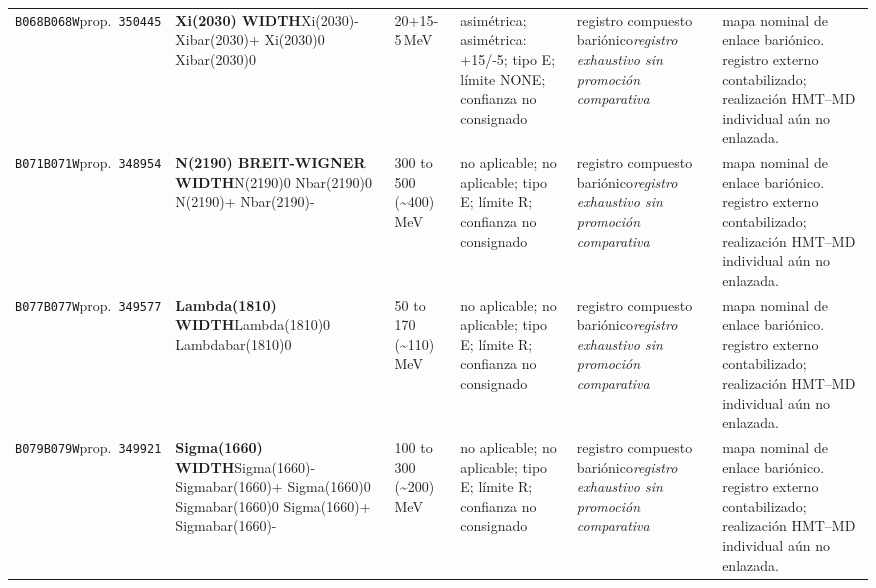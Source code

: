 \begin{landscape}
\begin{longtable}{L{1.85cm}L{4.45cm}L{2.35cm}L{4.05cm}L{3.35cm}L{7.15cm}}
\texttt{B068}\newline \texttt{B068W}\newline prop.\ \texttt{350445} & \textbf{Xi(2030) WIDTH}\newline Xi(2030)- \textbar{}\allowbreak{} Xibar(2030)+ \textbar{}\allowbreak{} Xi(2030)0 \textbar{}\allowbreak{} Xibar(2030)0 & 20+15-5\,MeV & asimétrica; asimétrica: +15/-5; tipo E; límite NONE; confianza no consignado & registro compuesto bariónico\newline \emph{registro exhaustivo sin promoción comparativa} & mapa nominal de enlace bariónico. registro externo contabilizado; realización HMT--MD individual aún no enlazada. \\
\texttt{B071}\newline \texttt{B071W}\newline prop.\ \texttt{348954} & \textbf{N(2190) BREIT-WIGNER WIDTH}\newline N(2190)0 \textbar{}\allowbreak{} Nbar(2190)0 \textbar{}\allowbreak{} N(2190)+ \textbar{}\allowbreak{} Nbar(2190)- & 300 to 500 (\textasciitilde{}400)\,MeV & no aplicable; no aplicable; tipo E; límite R; confianza no consignado & registro compuesto bariónico\newline \emph{registro exhaustivo sin promoción comparativa} & mapa nominal de enlace bariónico. registro externo contabilizado; realización HMT--MD individual aún no enlazada. \\
\texttt{B077}\newline \texttt{B077W}\newline prop.\ \texttt{349577} & \textbf{Lambda(1810) WIDTH}\newline Lambda(1810)0 \textbar{}\allowbreak{} Lambdabar(1810)0 & 50 to 170 (\textasciitilde{}110)\,MeV & no aplicable; no aplicable; tipo E; límite R; confianza no consignado & registro compuesto bariónico\newline \emph{registro exhaustivo sin promoción comparativa} & mapa nominal de enlace bariónico. registro externo contabilizado; realización HMT--MD individual aún no enlazada. \\
\texttt{B079}\newline \texttt{B079W}\newline prop.\ \texttt{349921} & \textbf{Sigma(1660) WIDTH}\newline Sigma(1660)- \textbar{}\allowbreak{} Sigmabar(1660)+ \textbar{}\allowbreak{} Sigma(1660)0 \textbar{}\allowbreak{} Sigmabar(1660)0 \textbar{}\allowbreak{} Sigma(1660)+ \textbar{}\allowbreak{} Sigmabar(1660)- & 100 to 300 (\textasciitilde{}200)\,MeV & no aplicable; no aplicable; tipo E; límite R; confianza no consignado & registro compuesto bariónico\newline \emph{registro exhaustivo sin promoción comparativa} & mapa nominal de enlace bariónico. registro externo contabilizado; realización HMT--MD individual aún no enlazada. \\

\end{longtable}
\end{landscape}
